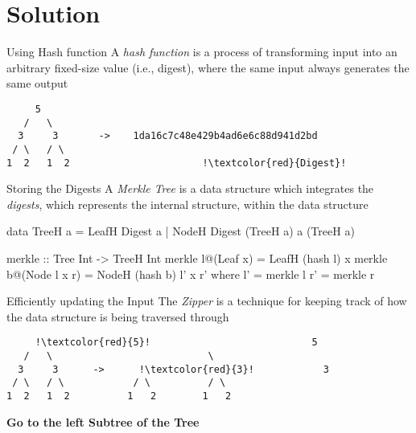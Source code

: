 \section{Solution}

\begin{slide}{Using Hash function}
A \textit{hash function} is a process of transforming input into an arbitrary fixed-size value (i.e., digest), where the same input always generates the same output

\begin{center}
\begin{verbatim}
     5 
   /   \
  3     3       ->    1da16c7c48e429b4ad6e6c88d941d2bd
 / \   / \    
1  2   1  2                       !\textcolor{red}{Digest}!  
\end{verbatim}
\end{center}
\end{slide}



\begin{slide}{Storing the Digests}
A \textit{Merkle Tree} is a data structure which integrates the \textit{digests}, which represents the internal structure, within the data structure

\vspace*{0.4cm}
\begin{haskell}
data TreeH a = LeafH Digest a
             | NodeH Digest (TreeH a) a (TreeH a)


merkle :: Tree Int -> TreeH Int
merkle l@(Leaf x)     = LeafH (hash l) x
merkle b@(Node l x r) = NodeH (hash b) l' x r'
  where
    l' = merkle l
    r' = merkle r
\end{haskell}
\end{slide}

\begin{slide}{Efficiently updating the Input}
The \textit{Zipper} is a technique for keeping track of how the data structure is being traversed through

\begin{center}
\begin{verbatim}
     !\textcolor{red}{5}!                            5     
   /   \                           \    
  3     3      ->      !\textcolor{red}{3}!            3    
 / \   / \            / \          / \  
1  2   1  2          1   2        1   2 
\end{verbatim}

\textbf{Go to the left Subtree of the Tree}
\end{center}
\end{slide}

